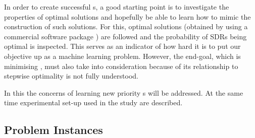 \documentclass[twocolumn]{svjour3}
\begin{document}
In order to create successful \dr s, a good starting point is to 
investigate the properties of optimal solutions and hopefully be able to learn 
how to mimic the construction of such solutions. For this, optimal 
solutions (obtained by using a commercial software package \cite{gurobi}) are 
followed and the probability of SDRs being optimal is inspected. 
This serves as an indicator of how hard it is to put our objective up as a 
machine learning problem. 
However, the end-goal, which is minimising \namerho, must also take into 
consideration because of its relationship to stepwise optimality is not fully 
understood.

In this  the concerns of learning new priority \dr s 
will be addressed. At the same time experimental set-up used in the study are 
described. 

\subsection{Problem Instances}\label{sec:data:sim}
\end{document}
